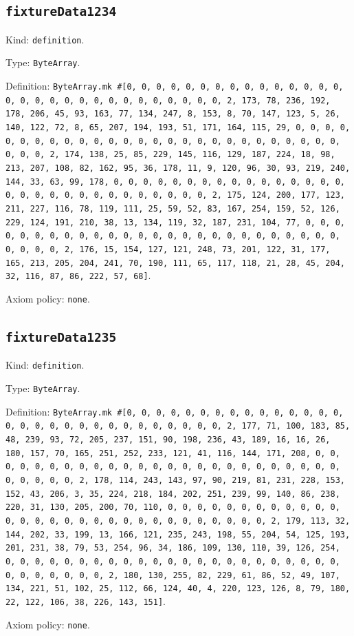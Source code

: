 \documentclass[11pt]{article}
\begin{document}
\subsection*{\texttt{fixtureData1234}}
\noindent Kind: \texttt{definition}.\par
\noindent Type: \texttt{ByteArray}.\par
\noindent Definition: \texttt{ByteArray.mk \#[0, 0, 0, 0, 0, 0, 0, 0, 0, 0, 0, 0, 0, 0, 0, 0, 0, 0, 0, 0, 0, 0, 0, 0, 0, 0, 0, 0, 0, 0, 2, 173, 78, 236, 192, 178, 206, 45, 93, 163, 77, 134, 247, 8, 153, 8, 70, 147, 123, 5, 26, 140, 122, 72, 8, 65, 207, 194, 193, 51, 171, 164, 115, 29, 0, 0, 0, 0, 0, 0, 0, 0, 0, 0, 0, 0, 0, 0, 0, 0, 0, 0, 0, 0, 0, 0, 0, 0, 0, 0, 0, 0, 0, 0, 2, 174, 138, 25, 85, 229, 145, 116, 129, 187, 224, 18, 98, 213, 207, 108, 82, 162, 95, 36, 178, 11, 9, 120, 96, 30, 93, 219, 240, 144, 33, 63, 99, 178, 0, 0, 0, 0, 0, 0, 0, 0, 0, 0, 0, 0, 0, 0, 0, 0, 0, 0, 0, 0, 0, 0, 0, 0, 0, 0, 0, 0, 0, 0, 2, 175, 124, 200, 177, 123, 211, 227, 116, 78, 119, 111, 25, 59, 52, 83, 167, 254, 159, 52, 126, 229, 124, 191, 210, 38, 13, 134, 119, 32, 187, 231, 104, 77, 0, 0, 0, 0, 0, 0, 0, 0, 0, 0, 0, 0, 0, 0, 0, 0, 0, 0, 0, 0, 0, 0, 0, 0, 0, 0, 0, 0, 0, 0, 2, 176, 15, 154, 127, 121, 248, 73, 201, 122, 31, 177, 165, 213, 205, 204, 241, 70, 190, 111, 65, 117, 118, 21, 28, 45, 204, 32, 116, 87, 86, 222, 57, 68]}.\par
\noindent Axiom policy: \texttt{none}.\par
\subsection*{\texttt{fixtureData1235}}
\noindent Kind: \texttt{definition}.\par
\noindent Type: \texttt{ByteArray}.\par
\noindent Definition: \texttt{ByteArray.mk \#[0, 0, 0, 0, 0, 0, 0, 0, 0, 0, 0, 0, 0, 0, 0, 0, 0, 0, 0, 0, 0, 0, 0, 0, 0, 0, 0, 0, 0, 0, 2, 177, 71, 100, 183, 85, 48, 239, 93, 72, 205, 237, 151, 90, 198, 236, 43, 189, 16, 16, 26, 180, 157, 70, 165, 251, 252, 233, 121, 41, 116, 144, 171, 208, 0, 0, 0, 0, 0, 0, 0, 0, 0, 0, 0, 0, 0, 0, 0, 0, 0, 0, 0, 0, 0, 0, 0, 0, 0, 0, 0, 0, 0, 0, 2, 178, 114, 243, 143, 97, 90, 219, 81, 231, 228, 153, 152, 43, 206, 3, 35, 224, 218, 184, 202, 251, 239, 99, 140, 86, 238, 220, 31, 130, 205, 200, 70, 110, 0, 0, 0, 0, 0, 0, 0, 0, 0, 0, 0, 0, 0, 0, 0, 0, 0, 0, 0, 0, 0, 0, 0, 0, 0, 0, 0, 0, 0, 0, 2, 179, 113, 32, 144, 202, 33, 199, 13, 166, 121, 235, 243, 198, 55, 204, 54, 125, 193, 201, 231, 38, 79, 53, 254, 96, 34, 186, 109, 130, 110, 39, 126, 254, 0, 0, 0, 0, 0, 0, 0, 0, 0, 0, 0, 0, 0, 0, 0, 0, 0, 0, 0, 0, 0, 0, 0, 0, 0, 0, 0, 0, 0, 0, 2, 180, 130, 255, 82, 229, 61, 86, 52, 49, 107, 134, 221, 51, 102, 25, 112, 66, 124, 40, 4, 220, 123, 126, 8, 79, 180, 22, 122, 106, 38, 226, 143, 151]}.\par
\noindent Axiom policy: \texttt{none}.\par
\end{document}
